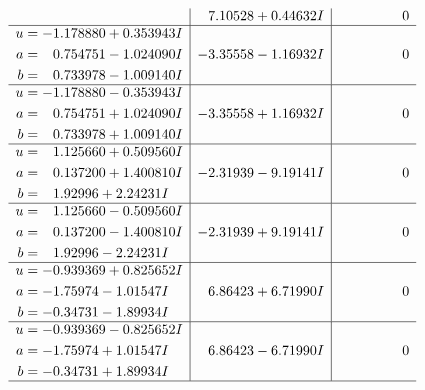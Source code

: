 \documentclass[1p]{elsarticle_modified}
\theoremstyle{definition}
\begin{document}
$$\begin{array}{c|c|c}
 & \phantom{-}7.10528 + 0.44632 I & \phantom{-0.000000 } 0 \\ \hline\begin{aligned}
u &= -1.178880 + 0.353943 I \\
a &= \phantom{-}0.754751 - 1.024090 I \\
b &= \phantom{-}0.733978 - 1.009140 I\end{aligned}
 & -3.35558 - 1.16932 I & \phantom{-0.000000 } 0 \\ \hline\begin{aligned}
u &= -1.178880 - 0.353943 I \\
a &= \phantom{-}0.754751 + 1.024090 I \\
b &= \phantom{-}0.733978 + 1.009140 I\end{aligned}
 & -3.35558 + 1.16932 I & \phantom{-0.000000 } 0 \\ \hline\begin{aligned}
u &= \phantom{-}1.125660 + 0.509560 I \\
a &= \phantom{-}0.137200 + 1.400810 I \\
b &= \phantom{-}1.92996 + 2.24231 I\end{aligned}
 & -2.31939 - 9.19141 I & \phantom{-0.000000 } 0 \\ \hline\begin{aligned}
u &= \phantom{-}1.125660 - 0.509560 I \\
a &= \phantom{-}0.137200 - 1.400810 I \\
b &= \phantom{-}1.92996 - 2.24231 I\end{aligned}
 & -2.31939 + 9.19141 I & \phantom{-0.000000 } 0 \\ \hline\begin{aligned}
u &= -0.939369 + 0.825652 I \\
a &= -1.75974 - 1.01547 I \\
b &= -0.34731 - 1.89934 I\end{aligned}
 & \phantom{-}6.86423 + 6.71990 I & \phantom{-0.000000 } 0 \\ \hline\begin{aligned}
u &= -0.939369 - 0.825652 I \\
a &= -1.75974 + 1.01547 I \\
b &= -0.34731 + 1.89934 I\end{aligned}
 & \phantom{-}6.86423 - 6.71990 I & \phantom{-0.000000 } 0\\
 \hline 
 \end{array}$$\newpage$$\begin{array}{c|c|c}  

\end{array}$$
\end{document}
